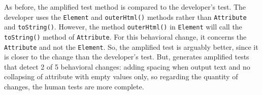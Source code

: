As before, the amplified test method is compared to the developer's test. 
The developer uses the \texttt{Element} and \texttt{outerHtml()} methods rather than \texttt{Attribute} and \texttt{toString()}.
However, the method \texttt{outerHtml()} in \texttt{Element} will call the \texttt{toString()} method of \texttt{Attribute}.
For this behavioral change, it concerns the \texttt{Attribute} and not the \texttt{Element}.
So, the amplified test is arguably better, since it is closer to the change than the developer's test.
But, \DCII generates amplified tests that detect 2 of 5 behavioral changes: adding spacing when output text and no collapsing of attribute with empty values only, so regarding the quantity of changes, the human tests are more complete.

\begin{figure}[h]
\centering

\end{figure}
